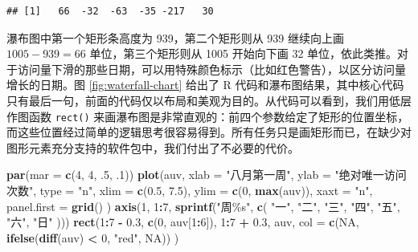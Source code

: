 \documentclass[
  b5paper,
  UTF8,twoside]{book}
\newenvironment{Shaded}{\begin{snugshade}}{\end{snugshade}}
\newcommand{\AttributeTok}[1]{\textcolor[rgb]{0.13,0.29,0.53}{#1}}
\newcommand{\ConstantTok}[1]{\textcolor[rgb]{0.56,0.35,0.01}{#1}}
\newcommand{\DecValTok}[1]{\textcolor[rgb]{0.00,0.00,0.81}{#1}}
\newcommand{\FloatTok}[1]{\textcolor[rgb]{0.00,0.00,0.81}{#1}}
\newcommand{\FunctionTok}[1]{\textcolor[rgb]{0.13,0.29,0.53}{\textbf{#1}}}
\newcommand{\NormalTok}[1]{#1}
\newcommand{\SpecialCharTok}[1]{\textcolor[rgb]{0.81,0.36,0.00}{\textbf{#1}}}
\newcommand{\StringTok}[1]{\textcolor[rgb]{0.31,0.60,0.02}{#1}}
\begin{document}
\begin{verbatim}
## [1]   66  -32  -63  -35 -217   30
\end{verbatim}

瀑布图中第一个矩形条高度为 939，第二个矩形则从 939 继续向上画 \(1005-939=66\) 单位，第三个矩形则从 1005 开始向下画 32 单位，依此类推。对于访问量下滑的那些日期，可以用特殊颜色标示（比如红色警告），以区分访问量增长的日期。图 \ref{fig:waterfall-chart} 给出了 R 代码和瀑布图结果，其中核心代码只有最后一句，前面的代码仅以布局和美观为目的。从代码可以看到，我们用低层作图函数 \texttt{rect()} 来画瀑布图是非常直观的：前四个参数给定了矩形的位置坐标，而这些位置经过简单的逻辑思考很容易得到。所有任务只是画矩形而已，在缺少对图形元素充分支持的软件包中，我们付出了不必要的代价。

\begin{Shaded}
\begin{Highlighting}[]
\FunctionTok{par}\NormalTok{(}\AttributeTok{mar =} \FunctionTok{c}\NormalTok{(}\DecValTok{4}\NormalTok{, }\DecValTok{4}\NormalTok{, .}\DecValTok{5}\NormalTok{, .}\DecValTok{1}\NormalTok{))}
\FunctionTok{plot}\NormalTok{(auv,}
  \AttributeTok{xlab =} \StringTok{"八月第一周"}\NormalTok{,}
  \AttributeTok{ylab =} \StringTok{"绝对唯一访问次数"}\NormalTok{, }\AttributeTok{type =} \StringTok{"n"}\NormalTok{,}
  \AttributeTok{xlim =} \FunctionTok{c}\NormalTok{(}\FloatTok{0.5}\NormalTok{, }\FloatTok{7.5}\NormalTok{),}
  \AttributeTok{ylim =} \FunctionTok{c}\NormalTok{(}\DecValTok{0}\NormalTok{, }\FunctionTok{max}\NormalTok{(auv)),}
  \AttributeTok{xaxt =} \StringTok{"n"}\NormalTok{, }\AttributeTok{panel.first =} \FunctionTok{grid}\NormalTok{()}
\NormalTok{)}
\FunctionTok{axis}\NormalTok{(}\DecValTok{1}\NormalTok{, }\DecValTok{1}\SpecialCharTok{:}\DecValTok{7}\NormalTok{, }\FunctionTok{sprintf}\NormalTok{(}\StringTok{"周\%s"}\NormalTok{, }\FunctionTok{c}\NormalTok{(}
  \StringTok{"一"}\NormalTok{, }\StringTok{"二"}\NormalTok{, }\StringTok{"三"}\NormalTok{, }\StringTok{"四"}\NormalTok{, }\StringTok{"五"}\NormalTok{, }\StringTok{"六"}\NormalTok{, }\StringTok{"日"}
\NormalTok{)))}
\FunctionTok{rect}\NormalTok{(}\DecValTok{1}\SpecialCharTok{:}\DecValTok{7} \SpecialCharTok{{-}} \FloatTok{0.3}\NormalTok{, }\FunctionTok{c}\NormalTok{(}\DecValTok{0}\NormalTok{, auv[}\DecValTok{1}\SpecialCharTok{:}\DecValTok{6}\NormalTok{]), }\DecValTok{1}\SpecialCharTok{:}\DecValTok{7} \SpecialCharTok{+} \FloatTok{0.3}\NormalTok{, auv,}
  \AttributeTok{col =} \FunctionTok{c}\NormalTok{(}\ConstantTok{NA}\NormalTok{, }\FunctionTok{ifelse}\NormalTok{(}\FunctionTok{diff}\NormalTok{(auv) }\SpecialCharTok{\textless{}} \DecValTok{0}\NormalTok{, }\StringTok{"red"}\NormalTok{, }\ConstantTok{NA}\NormalTok{))}
\NormalTok{)}
\end{Highlighting}
\end{Shaded}
\end{document}
